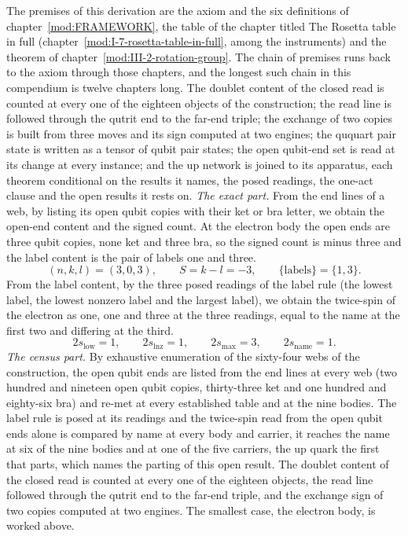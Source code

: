 \begin{chproof}
The premises of this derivation are the axiom and the six definitions of chapter~\ref{mod:FRAMEWORK}, the table of the chapter titled The Rosetta table in full (chapter~\ref{mod:I-7-rosetta-table-in-full}, among the instruments) and the theorem of chapter~\ref{mod:III-2-rotation-group}. The chain of premises runs back to the axiom through those chapters, and the longest such chain in this compendium is twelve chapters long.
The doublet content of the closed read is counted at every one of the eighteen objects of the construction; the read line is followed through the qutrit end to the far-end triple; the exchange of two copies is built from three moves and its sign computed at two engines; the ququart pair state is written as a tensor of qubit pair states; the open qubit-end set is read at its change at every instance; and the up network is joined to its apparatus, each theorem conditional on the results it names, the posed readings, the one-act clause and the open results it rests on.
\textit{The exact part.}
From the end lines of a web, by listing its open qubit copies with their ket or bra letter, we obtain the open-end content and the signed count. At the electron body the open ends are three qubit copies, none ket and three bra, so the signed count is minus three and the label content is the pair of labels one and three.
\begin{equation}
(n, k, l) = (3, 0, 3), \qquad S = k - l = -3, \qquad \{\text{labels}\} = \{1, 3\} .
\end{equation}
From the label content, by the three posed readings of the label rule (the lowest label, the lowest nonzero label and the largest label), we obtain the twice-spin of the electron as one, one and three at the three readings, equal to the name at the first two and differing at the third.
\begin{equation}
2s_{\mathrm{low}} = 1, \qquad 2s_{\mathrm{lnz}} = 1, \qquad 2s_{\max} = 3, \qquad 2s_{\mathrm{name}} = 1 .
\end{equation}
\textit{The census part.}
By exhaustive enumeration of the sixty-four webs of the construction, the open qubit ends are listed from the end lines at every web (two hundred and nineteen open qubit copies, thirty-three ket and one hundred and eighty-six bra) and re-met at every established table and at the nine bodies. The label rule is posed at its readings and the twice-spin read from the open qubit ends alone is compared by name at every body and carrier, it reaches the name at six of the nine bodies and at one of the five carriers, the up quark the first that parts, which names the parting of this open result. The doublet content of the closed read is counted at every one of the eighteen objects, the read line followed through the qutrit end to the far-end triple, and the exchange sign of two copies computed at two engines. The smallest case, the electron body, is worked above.

\end{chproof}
